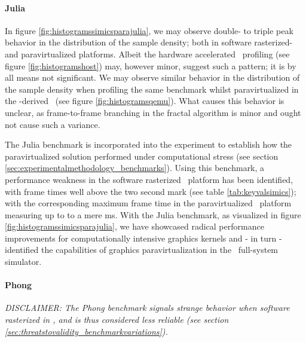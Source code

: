 

\paragraph{Julia}
\label{par:results_julia}
In figure \ref{fig:histogramssimicsparajulia}, we may observe double- to triple peak behavior in the distribution of the sample density; both in software rasterized- and paravirtualized platforms.
Albeit the hardware accelerated \dvttermhost\ profiling (see figure \ref{fig:histogramshost}) may, however minor, suggest such a pattern; it is by all means not significant.
We may observe similar behavior in the distribution of the sample density when profiling the same benchmark whilst paravirtualized in the \dvttermqemu -derived \dvttermandroidemulator\ (see figure \ref{fig:histogramsqemu}).
What causes this behavior is unclear, as frame-to-frame branching in the fractal algorithm is minor and ought not cause such a variance.

The Julia benchmark is incorporated into the experiment to establish how the paravirtualized solution performed under computational stress (see section \ref{sec:experimentalmethodology_benchmarks}).
Using this benchmark, a performance weakness in the software rasterized \dvttermsimics\ platform has been identified, with frame times well above the two second mark (see table \ref{tab:keyvalsimics}); with the corresponding maximum frame time in the paravirtualized \dvttermsimics\ platform measuring up to to a mere  ms.
With the Julia benchmark, as visualized in figure \ref{fig:histogramssimicsparajulia}, we have showcased radical performance improvements for computationally intensive graphics kernels and - in turn - identified the capabilities of graphics paravirtualization in the \dvttermsimics\ full-system simulator.



\paragraph{Phong}
\label{par:results_phong}
\textit{DISCLAIMER: The Phong benchmark signals strange behavior when software rasterized in \dvttermsimics , and is thus considered less reliable (see section \ref{sec:threatstovalidity_benchmarkvariations}).}\\

